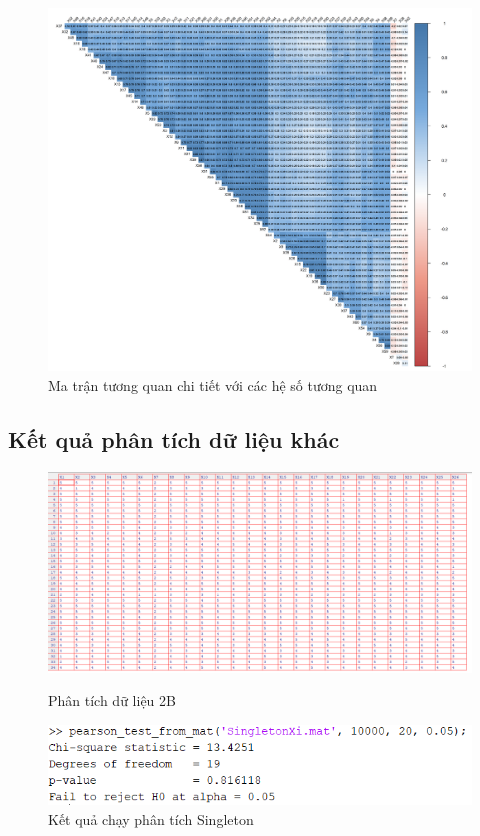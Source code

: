 \begin{figure}[h!]
    \centering
    \includegraphics[width=0.8\linewidth]{../../assets/images/correlation_matrix_1.png}
    \caption{Ma trận tương quan chi tiết với các hệ số tương quan}
\end{figure}

\subsection{Kết quả phân tích dữ liệu khác}

\begin{figure}[h!]
    \centering
    \begin{minipage}{0.45\textwidth}
        \centering
        \includegraphics[width=\textwidth]{../../assets/images/data2b.png}
        \caption{Phân tích dữ liệu 2B}
    \end{minipage}
    \hfill
    \begin{minipage}{0.45\textwidth}
        \centering
        \includegraphics[width=\textwidth]{../../assets/images/chay_singleton.png}
        \caption{Kết quả chạy phân tích Singleton}
    \end{minipage}
\end{figure}

